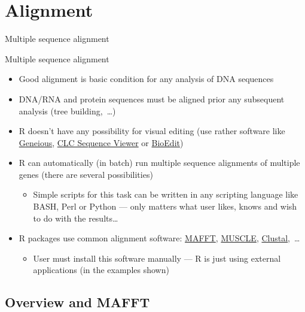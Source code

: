 \documentclass[compress, ucs, xelatex, 11pt, xcolor=svgnames,
  hyperref={
    bookmarks=true,
    unicode=true,
    colorlinks=true,
    pdftitle={Molecular data in R},
    plainpages=false,
    pdfauthor={Vojtech Zeisek},
    pdfsubject={Course about phylogeny and evolution in R},
    pdfcreator={XeLaTeX},
    pdfkeywords={R, evolution, phylogeny, molecular data},
    linkcolor=Tomato,
    anchorcolor=SaddleBrown,
    citecolor=Goldenrod,
    filecolor=DarkMagenta,
    menucolor=Sienna,
    urlcolor=DarkTurquoise,
    pdftex},
  url={hyphens, lowtilde} %
  ]{beamer}
\begin{document}
\section{Alignment}

\begin{frame}{Multiple sequence alignment}
  \tableofcontents[currentsection, sectionstyle=show/hide, hideothersubsections]
\end{frame}

\begin{frame}{Multiple sequence alignment}
  \label{alignment}
  \begin{itemize}
    \item Good alignment is basic condition for any analysis of DNA sequences
    \item DNA/RNA and protein sequences must be aligned prior any subsequent analysis (tree building,~\ldots)
    \item R doesn't have any possibility for visual editing (use rather software like \href{https://www.geneious.com/}{Geneious}, \href{https://www.qiagenbioinformatics.com/products/clc-sequence-viewer/}{CLC Sequence Viewer} or \href{http://www.mbio.ncsu.edu/bioedit/bioedit.html}{BioEdit})
    \item R can automatically (in batch) run multiple sequence alignments of multiple genes (there are several possibilities)
    \begin{itemize}
      \item Simple scripts for this task can be written in any scripting language like BASH, Perl or Python --- only matters what user likes, knows and wish to do with the results\ldots
    \end{itemize}
    \item R packages use common alignment software: \href{https://mafft.cbrc.jp/alignment/software/}{MAFFT}, \href{https://www.drive5.com/muscle/}{MUSCLE}, \href{http://clustal.org/}{Clustal},~\ldots
    \begin{itemize}
      \item User must install this software manually --- R is just using external applications (in the examples shown)
    \end{itemize}
  \end{itemize}
\end{frame}

\subsection{Overview and MAFFT}
\end{document}
